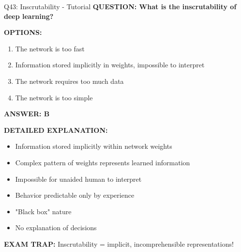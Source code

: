 \documentclass[8pt]{beamer}
\begin{document}
	\begin{frame}{Q43: Inscrutability - Tutorial}
		\fontsize{6.5}{7.5}\selectfont
		\textbf{QUESTION: What is the inscrutability of deep learning?}
		
		\vspace{0.1cm}
		\textbf{OPTIONS:}
		\begin{enumerate}
			\item The network is too fast
			\item Information stored implicitly in weights, impossible to interpret
			\item The network requires too much data
			\item The network is too simple
		\end{enumerate}
		
		\vspace{0.1cm}
		\textcolor{myblue}{\textbf{ANSWER: B}}
		
		\vspace{0.1cm}
		\textbf{DETAILED EXPLANATION:}
		\begin{itemize}
			\item Information stored implicitly within network weights
			\item Complex pattern of weights represents learned information
			\item Impossible for unaided human to interpret
			\item Behavior predictable only by experience
			\item "Black box" nature
			\item No explanation of decisions
		\end{itemize}
		
		\vspace{0.1cm}
		\textcolor{myred}{\textbf{EXAM TRAP:}} Inscrutability = \textcolor{myblue}{implicit, incomprehensible representations}!
	\end{frame}
	
\end{document}
